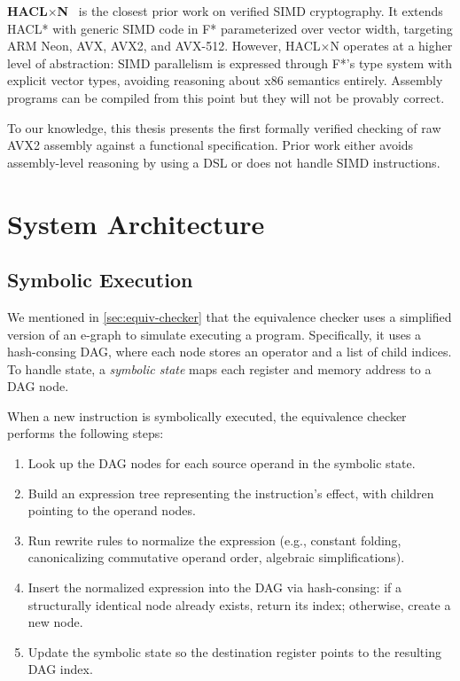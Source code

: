\textbf{HACL$\times$N}~\autocite{haclxn2020} is the closest prior work on verified SIMD cryptography.
It extends HACL* with generic SIMD code in F* parameterized over vector width, targeting ARM Neon, AVX, AVX2, and AVX-512.
However, HACL$\times$N operates at a higher level of abstraction: SIMD parallelism is expressed through F*'s type system with explicit vector types, avoiding reasoning about x86 semantics entirely. Assembly programs can be compiled from this point but they will not be provably correct.


To our knowledge, this thesis presents the first formally verified checking of raw AVX2 assembly against a functional specification. Prior work either avoids assembly-level reasoning by using a DSL or does not handle SIMD instructions.



\chapter{System Architecture}
\label{ch:architecture}

\section{Symbolic Execution}

We mentioned in \autoref{sec:equiv-checker} that the equivalence checker uses a simplified version of an e-graph to simulate executing a program.
Specifically, it uses a hash-consing DAG, where each node stores an operator and a list of child indices.
To handle state, a \textit{symbolic state} maps each register and memory address to a DAG node. 

When a new instruction is symbolically executed, the
equivalence checker performs the following steps: 

\begin{enumerate}           
    \item Look up the DAG nodes for each source operand in the symbolic state.
    \item Build an expression tree representing the instruction's effect, with children pointing to the operand nodes.
    \item Run rewrite rules to normalize the expression (e.g., constant folding, canonicalizing commutative operand order, algebraic simplifications).                           
    \item Insert the normalized expression into the DAG via hash-consing: if a structurally identical node already exists, return its index; otherwise, create a new node.
    \item Update the symbolic state so the destination register points to the resulting DAG index.   
\end{enumerate}

